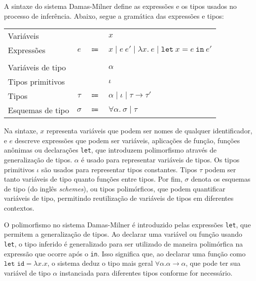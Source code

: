 A sintaxe do sistema Damas-Milner define as expressões e os tipos usados no processo de inferência.
Abaixo, segue a gramática das expressões e tipos:

\begin{tabular}{lccl}
    Variáveis         &          &             & $x$                                                                             \\
    Expressões        & $e$      & $\Coloneqq$ & $x \mid e \ e' \mid \lambda x.\ e \mid \mathtt{let} \ x = e \ \mathtt{in} \ e'$ \\
                                                                                                                                 \\
    Variáveis de tipo &          &             & $\alpha$                                                                        \\
    Tipos primitivos  &          &             & $\iota$                                                                         \\
    Tipos             & $\tau$   & $\Coloneqq$ & $\alpha \mid \iota \mid \tau \rightarrow \tau'$                                 \\
    Esquemas de tipo  & $\sigma$ & $\Coloneqq$ & $\forall \alpha.\ \sigma \mid \tau$                                             \\
\end{tabular}

\phantom{NewLine}

Na sintaxe, $x$ representa variáveis que podem ser nomes de qualquer identificador, e $e$ descreve expressões que podem ser variáveis, aplicações de função, funções anônimas ou declarações \texttt{let}, que introduzem polimorfismo através de generalização de tipos.
$\alpha$ é usado para representar variáveis de tipos.
Os tipos primitivos $\iota$ são usados para representar tipos constantes.
Tipos $\tau$ podem ser tanto variáveis de tipo quanto funções entre tipos.
Por fim, $\sigma$ denota os esquemas de tipo (do inglês \textit{schemes}), ou tipos polimórficos, que podem quantificar variáveis de tipo, permitindo reutilização de variáveis de tipos em diferentes contextos.

O polimorfismo no sistema Damas-Milner é introduzido pelas expressões \texttt{let}, que permitem a generalização de tipos.
Ao declarar uma variável ou função usando \texttt{let}, o tipo inferido é generalizado para ser utilizado de maneira polimórfica na expressão que ocorre após o \texttt{in}.
Isso significa que, ao declarar uma função como $\texttt{let id} = \lambda x.x$, o sistema deduz o tipo mais geral $\forall \alpha. \alpha \rightarrow \alpha$, que pode ter sua variável de tipo $\alpha$ instanciada para diferentes tipos conforme for necessário.

